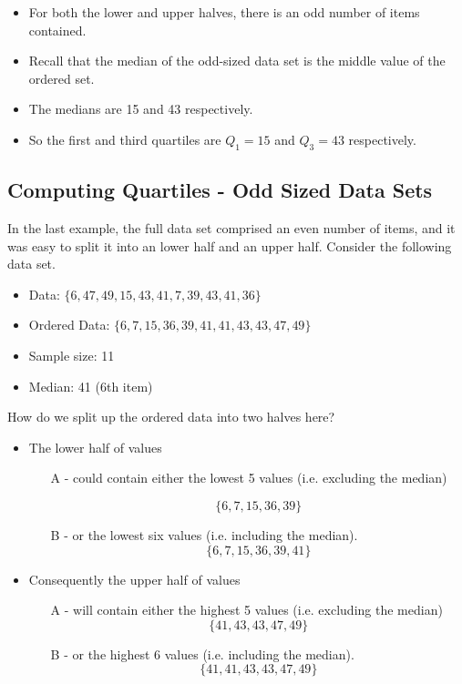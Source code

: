 \documentclass[a4paper,12pt]{article}
\begin{document}
	
	\begin{itemize}
		\item For both the lower and upper halves, there is an odd number of items contained.
		\item Recall that the median of the odd-sized data set is the middle value of the ordered set.
		\item The medians are 15 and 43 respectively.
		\item So the first and third quartiles are $Q_1 = 15$ and $Q_3 = 43$ respectively.
	\end{itemize}

\subsection*{Computing Quartiles - Odd Sized Data Sets}
	In the last example, the full data set comprised an even number of items, and it was easy to split it into an lower half and an upper half. Consider the following data set.
	\begin{itemize}
		\item Data:  $\{6, 47, 49, 15, 43, 41, 7, 39, 43, 41, 36\}$
		\item Ordered Data: $\{ 6, 7 ,15, 36, 39, 41, 41 ,43, 43, 47, 49 \}$
		\item Sample size: 11
		\item Median:  41 (6th item)
	\end{itemize}
	How do we split up the ordered data into two halves here?

	\begin{itemize}
		\item The lower half of values  \begin{itemize} \item[A] - could contain either the lowest 5 values (i.e. excluding the median)
			
			\[\{ 6, 7 ,15, 36, 39\}\]
			\item[B] - or the lowest six values (i.e. including the median).  \[\{ 6, 7 ,15, 36, 39,41\}\] \end{itemize}
		\item Consequently the upper half of values \begin{itemize} \item[A] -  will contain either the highest 5 values (i.e. excluding the median) \[\{ 41 ,43, 43, 47, 49 \}\] \item[B] - or the highest 6 values (i.e. including the median).
			\[\{ 41, 41 ,43, 43, 47, 49 \}\] \end{itemize}
		
	\end{itemize}
	
\end{document}
